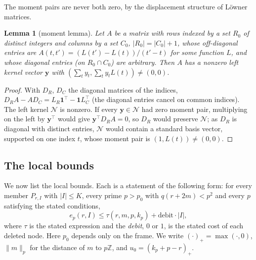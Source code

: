 \documentclass[11pt]{amsart}
\newtheorem{lemma}[theorem]{Lemma}
\theoremstyle{definition}
\theoremstyle{remark}
\numberwithin{equation}{section}
\newcommand{\Z}{\mathbb Z}
\begin{document}
The moment pairs are never both zero, by the displacement structure of L\"owner matrices.

\begin{lemma}[moment lemma]\label{lem:moment}
Let $A$ be a matrix with rows indexed by a set $R_0$ of distinct integers and columns by a set $C_0$, $|R_0|=|C_0|+1$,
whose off-diagonal entries are $A(t,t')=(L(t')-L(t))/(t'-t)$ for some function $L$, and whose diagonal entries (on
$R_0\cap C_0$) are arbitrary. Then $A$ has a nonzero left kernel vector $\mathbf y$ with
$(\sum_ty_t,\sum_ty_tL(t))\ne(0,0)$.
\end{lemma}
\begin{proof}
With $D_R$, $D_C$ the diagonal matrices of the indices, $D_RA-AD_C=L_R\mathbf 1^{\top}-\mathbf 1L_C^{\top}$ (the diagonal
entries cancel on common indices). The left kernel $\mathcal N$ is nonzero. If every $\mathbf y\in\mathcal N$ had zero
moment pair, multiplying on the left by $\mathbf y^{\top}$ would give $\mathbf y^{\top}D_RA=0$, so $D_R$ would preserve
$\mathcal N$; as $D_R$ is diagonal with distinct entries, $\mathcal N$ would contain a standard basis vector, supported on
one index $t$, whose moment pair is $(1,L(t))\ne(0,0)$.
\end{proof}

\subsection{The local bounds}
We now list the local bounds. Each is a statement of the following form: for every member $P_{r,I}$ with $|I|\le K$,
every prime $p>p_0$ with $q(r+2m)<p^2$ and every $p$ satisfying the stated conditions,
\begin{equation}\label{eq:localform}
 e_p(r,I)\le\tau(r,m,p,k_p)+\mathrm{debit}\cdot|I| ,
\end{equation}
where $\tau$ is the stated expression and the \emph{debit}, $0$ or $1$, is the stated cost of each deleted node. Here $p_0$
depends only on the frame. We write $(\cdot)_+=\max(\cdot,0)$, $\|m\|_p$ for the distance of $m$ to $p\Z$, and $u_0=(k_p+p-r)_+$.
\end{document}
